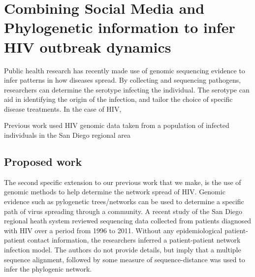 \section{Combining Social Media and Phylogenetic information to infer HIV outbreak dynamics}


Public health research has recently made use of genomic sequencing evidence to infer patterns in how diseases spread. By collecting and sequencing pathogens, researchers can determine the serotype infecting the individual. The serotype can aid in identifying the origin of the infection, and tailor the choice of specific disease treatments. In the case of HIV, 

 Previous work used HIV genomic data taken from a population of infected individuals in the San Diego regional area
 





\subsection{Proposed work}






The second specific extension to our previous work that we make, is the use of genomic methods to help determine the network spread of HIV. Genomic evidence such as pylogenetic trees/networks can be used to determine a specific path of virus spreading through a community. A recent study of the San Diego regional heath system reviewed sequencing data collected from patients diagnosed with HIV over a period from 1996 to 2011\cite{little2014using}. Without any epidemiological patient-patient contact information, the researchers inferred a patient-patient network infection model. The authors do not provide details, but imply that a multiple sequence alignment, followed by some measure of sequence-distance was used to infer the phylogenic network.

